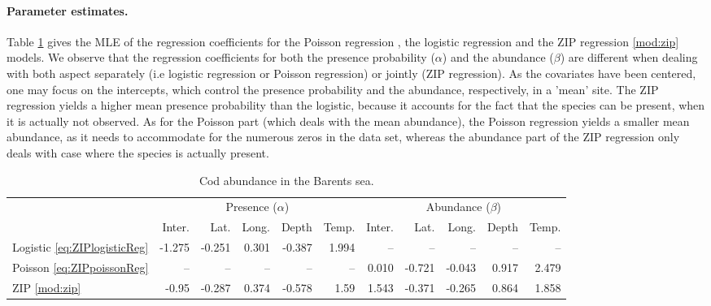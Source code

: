 \paragraph{Parameter estimates.}
Table \ref{tab:codBarentsCoefs} gives the MLE of the regression coefficients for the Poisson regression , the logistic regression  and the ZIP regression \eqref{mod:zip} models. We observe that the regression coefficients for both the presence probability ($\alpha$) and the abundance ($\beta$) are different when dealing with both aspect separately (i.e logistic regression or Poisson regression) or jointly (ZIP regression). 
As the covariates have been centered, one may focus on the intercepts, which control the presence probability and the abundance, respectively, in a 'mean' site. 
The ZIP regression yields a higher mean presence probability than the logistic, because it accounts for the fact that the species can be present, when it is actually not observed. 
As for the Poisson part (which deals with the mean abundance), the Poisson regression yields a smaller mean abundance, as it needs to accommodate for the numerous zeros in the data set, whereas the abundance part of the ZIP regression only deals with case where the species is actually present.

\begin{table}[ht]
  \begin{center}
    \begin{tabular}{l|rrrrr|rrrrr} 
      & \multicolumn{5}{c|}{Presence ($\alpha$)} & \multicolumn{5}{c}{Abundance ($\beta$)} \\
      & Inter. & Lat. & Long. & Depth & Temp. & Inter. & Lat. & Long. & Depth & Temp. \\
      \hline
      Logistic \eqref{eq:ZIPlogisticReg} & -1.275 & -0.251 & 0.301 & -0.387 & 1.994 & -- & -- & -- & -- & -- \\ 
      Poisson \eqref{eq:ZIPpoissonReg} & -- & -- & -- & -- & -- & 0.010 & -0.721 & -0.043 & 0.917 & 2.479 \\ 
      ZIP \eqref{mod:zip} & -0.95 & -0.287 & 0.374 & -0.578 & 1.59 & 1.543 & -0.371 & -0.265 & 0.864 & 1.858 
    \end{tabular} 
    \caption{Cod abundance in the Barents sea.  \label{tab:codBarentsCoefs}}
  \end{center}
\end{table}

